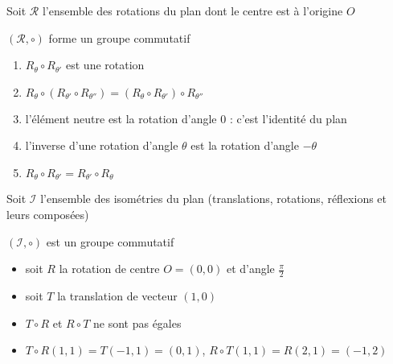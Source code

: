 \begin{frame}


Soit $\mathcal{R}$ l'ensemble des rotations du plan dont le centre est à l'origine $O$

$(\mathcal{R},\circ)$ forme un groupe commutatif

\pause

\hfill\begin{minipage}{0.5\textwidth}
\end{minipage}

\vspace*{-5ex}

\pause

   \begin{enumerate}
     \item $R_\theta \circ R_{\theta'}$ est une rotation
\pause
     \item  $R_\theta \circ (R_{\theta'}\circ R_{\theta''})=(R_\theta \circ R_{\theta'})\circ R_{\theta''}$
\pause
     \item l'élément neutre est la rotation d'angle $0$ : c'est l'identité du plan
 \pause
    \item l'inverse d'une rotation d'angle $\theta$ est la rotation d'angle $-\theta$
\pause
     \item $R_\theta \circ R_{\theta'}=R_{\theta'} \circ R_{\theta}$
   \end{enumerate}
\end{frame}


\begin{frame}
Soit $\mathcal{I}$ l'ensemble des isométries du plan (translations, rotations, réflexions et leurs composées)

$(\mathcal{I},\circ)$ est un groupe  commutatif

\pause

  \begin{itemize}
     \item soit $R$ la rotation de centre $O=(0,0)$ et d'angle $\frac \pi 2$
     \item soit $T$ la translation de vecteur $(1,0)$
     \item $T \circ R$ et $R \circ T$ ne sont pas égales
\pause
     \item $T \circ R (1,1) = T (-1,1) = (0,1)$, $R\circ T(1,1) = R(2,1) = (-1,2)$
  \end{itemize}




\end{frame}


